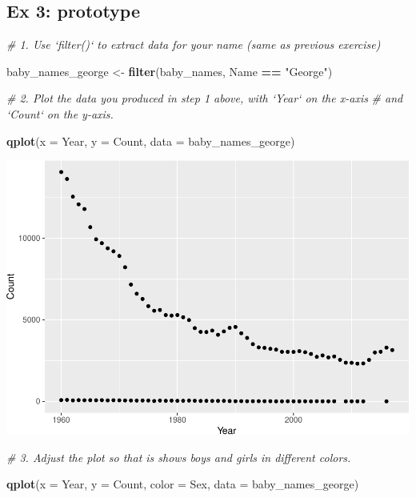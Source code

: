\documentclass[]{book}
\newenvironment{Shaded}{\begin{snugshade}}{\end{snugshade}}
\newcommand{\CommentTok}[1]{\textcolor[rgb]{0.56,0.35,0.01}{\textit{#1}}}
\newcommand{\DataTypeTok}[1]{\textcolor[rgb]{0.13,0.29,0.53}{#1}}
\newcommand{\KeywordTok}[1]{\textcolor[rgb]{0.13,0.29,0.53}{\textbf{#1}}}
\newcommand{\NormalTok}[1]{#1}
\newcommand{\OperatorTok}[1]{\textcolor[rgb]{0.81,0.36,0.00}{\textbf{#1}}}
\newcommand{\StringTok}[1]{\textcolor[rgb]{0.31,0.60,0.02}{#1}}
\begin{document}
\hypertarget{ex-3-prototype}{%
\subsection{Ex 3: prototype}\label{ex-3-prototype}}

\begin{Shaded}
\begin{Highlighting}[]
\CommentTok{# 1. Use `filter()` to extract data for your name (same as previous exercise)  }

\NormalTok{baby_names_george <-}\StringTok{ }\KeywordTok{filter}\NormalTok{(baby_names, Name }\OperatorTok{==}\StringTok{ "George"}\NormalTok{)}
\end{Highlighting}
\end{Shaded}

\begin{Shaded}
\begin{Highlighting}[]
\CommentTok{# 2.  Plot the data you produced in step 1 above, with `Year` on the x-axis}
\CommentTok{#     and `Count` on the y-axis.}

\KeywordTok{qplot}\NormalTok{(}\DataTypeTok{x =}\NormalTok{ Year, }\DataTypeTok{y =}\NormalTok{ Count, }\DataTypeTok{data =}\NormalTok{ baby_names_george)}
\end{Highlighting}
\end{Shaded}

\includegraphics{R/Rintro/figures/unnamed-chunk-67-1.pdf}

\begin{Shaded}
\begin{Highlighting}[]
\CommentTok{# 3. Adjust the plot so that is shows boys and girls in different colors.}

\KeywordTok{qplot}\NormalTok{(}\DataTypeTok{x =}\NormalTok{ Year, }\DataTypeTok{y =}\NormalTok{ Count, }\DataTypeTok{color =}\NormalTok{ Sex, }\DataTypeTok{data =}\NormalTok{ baby_names_george)}
\end{Highlighting}
\end{Shaded}
\end{document}
